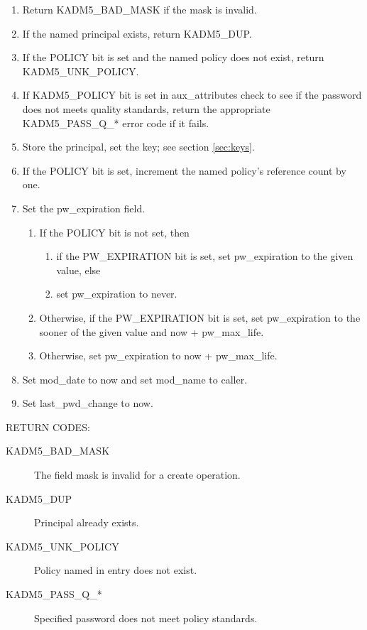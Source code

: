 \begin{enumerate}

\item Return KADM5_BAD_MASK if the mask is invalid.
\item If the named principal exists, return KADM5_DUP.
\item If the POLICY bit is set and the named policy does not exist,
return KADM5_UNK_POLICY.
\item If KADM5_POLICY bit is set in aux_attributes check to see if
the password does not meets quality standards, return the appropriate
KADM5_PASS_Q_* error code if it fails.
\item Store the principal, set the key; see section \ref{sec:keys}.
\item If the POLICY bit is set, increment the named policy's reference
count by one.

\item Set the pw_expiration field.
\begin{enumerate}
\item If the POLICY bit is not set, then
\begin{enumerate}
\item if the PW_EXPIRATION bit is set, set pw_expiration to the given
value, else
\item set pw_expiration to never.
\end{enumerate}
\item Otherwise, if the PW_EXPIRATION bit is set, set pw_expiration to
the sooner of the given value and now + pw_max_life.
\item Otherwise, set pw_expiration to now + pw_max_life.
\end{enumerate}

\item Set mod_date to now and set mod_name to caller.
\item Set last_pwd_change to now.
\end{enumerate}

RETURN CODES:

\begin{description}
\item[KADM5_BAD_MASK] The field mask is invalid for a create
operation.
\item[KADM5_DUP] Principal already exists.
\item[KADM5_UNK_POLICY] Policy named in entry does not exist.
\item[KADM5_PASS_Q_*] Specified password does not meet policy
standards.
\end{description}

